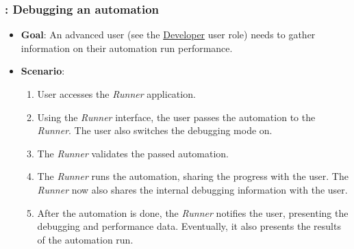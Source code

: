 \subsubsection*{\usecase: Debugging an automation}
\begin{itemize}
    \item \textbf{Goal}: An advanced user (see the \hyperref[DevUserRole]{Developer} user role) needs to gather information on their automation run performance.
    \item \textbf{Scenario}: 
    \begin{enumerate}[label=\arabic*.]
        \item User accesses the \textit{Runner} application. 
        \item Using the \textit{Runner} interface, the user passes the automation to the \textit{Runner}. The user also
        switches the debugging mode on.
        \item The \textit{Runner} validates the passed automation.
        \item The \textit{Runner} runs the automation, sharing the progress with the user.
        The \textit{Runner} now also shares the internal debugging information with the user. 
        \item After the automation is done, the \textit{Runner} notifies the user, presenting the debugging 
        and performance data. Eventually, it also presents the results of the automation run.
    \end{enumerate}
\end{itemize}


